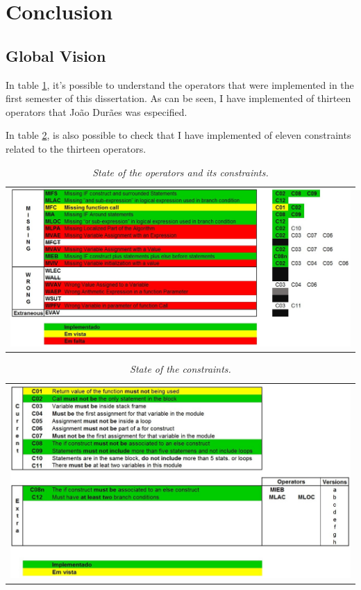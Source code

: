 \clearpage
\section{Conclusion}

\subsection{Global Vision}

In table \ref{tab:operators_status}, it's possible to understand the operators that were implemented in the first semester of this dissertation. As can be seen, I have implemented  of thirteen operators that João Durães was especified.

In table \ref{tab:constraints_status}, is also possible to check that I have implemented  of eleven constraints related to the thirteen operators.

\begin{table}[ht]
\begin{tabular}{c}
\includegraphics[width=1.1\textwidth]{img/operators_status.jpg}
\end{tabular}
\caption{\small \sl State of the operators and its constraints.\label{tab:operators_status}}
\end{table}



\begin{table}[ht]
\begin{tabular}{c}
\includegraphics[width=1.1\textwidth]{img/constraints_status.jpg}
\end{tabular}
\caption{\small \sl State of the constraints.\label{tab:constraints_status}}
\end{table}

